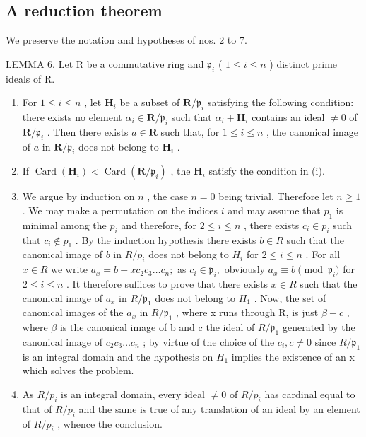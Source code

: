 \subsection{A reduction theorem}

We preserve the notation and hypotheses of nos. 2 to 7.

LEMMA 6. Let R be a commutative ring and \(\mathfrak{p}_i\) ( \(1 \leqslant i \leqslant n\) ) distinct prime ideals of R.

\begin{enumerate}
\def\labelenumi{(\roman{enumi})}
\item
  For \(1 \leqslant i \leqslant n\) , let \(\mathbf{H}_i\) be a subset of \(\mathbf{R} / \mathfrak{p}_i\) satisfying the following condition: there exists no element \(\alpha_i \in \mathbf{R} / \mathfrak{p}_i\) such that \(\alpha_i + \mathbf{H}_i\) contains an ideal \(\neq 0\) of \(\mathbf{R} / \mathfrak{p}_i\) . Then there exists \(a \in \mathbf{R}\) such that, for \(1 \leqslant i \leqslant n\) , the canonical image of \(a\) in \(\mathbf{R} / \mathfrak{p}_i\) does not belong to \(\mathbf{H}_i\) .
\item
  If \(\operatorname{Card}(\mathbf{H}_i) < \operatorname{Card}(\mathbf{R} / \mathfrak{p}_i)\) , the \(\mathbf{H}_i\) satisfy the condition in (i).
\item
  We argue by induction on \(n\) , the case \(n = 0\) being trivial. Therefore let \(n \geqslant 1\) . We may make a permutation on the indices \(i\) and may assume that \(p_1\) is minimal among the \(p_i\) and therefore, for \(2 \leqslant i \leqslant n\) , there exists \(c_i \in p_i\) such that \(c_i \notin p_1\) . By the induction hypothesis there exists \(b \in R\) such that the canonical image of \(b\) in \(R / p_i\) does not belong to \(H_i\) for \(2 \leqslant i \leqslant n\) . For all \(x \in R\) we write \(a_{x}=b+xc_{2}c_{3}\ldots c_{n};\) as \(c_{i}\in\mathfrak{p}_{i},\) obviously \(a_{x}\equiv b\pmod{\mathfrak{p}_{i}}\) for \(2\leqslant i\leqslant n\) . It therefore suffices to prove that there exists \(x\in R\) such that the canonical image of \(a_{x}\) in \(R/\mathfrak{p}_{1}\) does not belong to \(H_{1}\) . Now, the set of canonical images of the \(a_{x}\) in \(R/\mathfrak{p}_{1}\) , where x runs through R, is just \(\beta+c\) , where \(\beta\) is the canonical image of b and c the ideal of \(R/\mathfrak{p}_{1}\) generated by the canonical image of \(c_{2}c_{3}\ldots c_{n}\) ; by virtue of the choice of the \(c_{i},c\neq0\) since \(R/\mathfrak{p}_{1}\) is an integral domain and the hypothesis on \(H_{1}\) implies the existence of an x which solves the problem.
\item
  As \(R/p_{i}\) is an integral domain, every ideal \(\neq0\) of \(R/p_{i}\) has cardinal equal to that of \(R/p_{i}\) and the same is true of any translation of an ideal by an element of \(R/p_{i}\) , whence the conclusion.
\end{enumerate}

